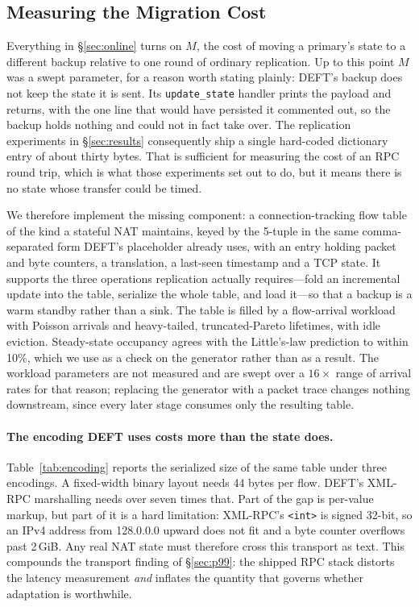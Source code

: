 \subsection{Measuring the Migration Cost}
\label{sec:online:M}

Everything in \S\ref{sec:online} turns on $M$, the cost of moving a primary's
state to a different backup relative to one round of ordinary replication. Up to
this point $M$ was a swept parameter, for a reason worth stating plainly: DEFT's
backup does not keep the state it is sent. Its \texttt{update\_state} handler
prints the payload and returns, with the one line that would have persisted it
commented out, so the backup holds nothing and could not in fact take over. The
replication experiments in \S\ref{sec:results} consequently ship a single
hard-coded dictionary entry of about thirty bytes. That is sufficient for
measuring the cost of an RPC round trip, which is what those experiments set out
to do, but it means there is no state whose transfer could be timed.

We therefore implement the missing component: a connection-tracking flow table of
the kind a stateful NAT maintains, keyed by the 5-tuple in the same
comma-separated form DEFT's placeholder already uses, with an entry holding
packet and byte counters, a translation, a last-seen timestamp and a TCP state.
It supports the three operations replication actually requires---fold an
incremental update into the table, serialize the whole table, and load it---so
that a backup is a warm standby rather than a sink. The table is filled by a
flow-arrival workload with Poisson arrivals and heavy-tailed, truncated-Pareto
lifetimes, with idle eviction. Steady-state occupancy agrees with the Little's-law
prediction to within 10\%, which we use as a check on the generator rather than as
a result. The workload parameters are not measured and are swept over a
$16\times$ range of arrival rates for that reason; replacing the generator with a
packet trace changes nothing downstream, since every later stage consumes only the
resulting table.

\paragraph{The encoding DEFT uses costs more than the state does.}
Table~\ref{tab:encoding} reports the serialized size of the same table under
three encodings. A fixed-width binary layout needs 44 bytes per flow. DEFT's
XML-RPC marshalling needs over seven times that. Part of the gap is per-value
markup, but part of it is a hard limitation: XML-RPC's \texttt{<int>} is signed
32-bit, so an IPv4 address from 128.0.0.0 upward does not fit and a byte counter
overflows past 2\,GiB. Any real NAT state must therefore cross this transport as
text. This compounds the transport finding of \S\ref{sec:p99}: the shipped
RPC stack distorts the latency measurement \emph{and} inflates the quantity that
governs whether adaptation is worthwhile.

